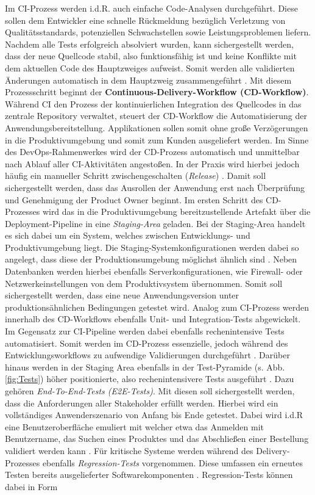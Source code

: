 Im CI-Prozess werden i.d.R. auch einfache Code-Analysen durchgeführt. Diese sollen dem Entwickler eine schnelle Rückmeldung bezüglich Verletzung von Qualitätsstandards, potenziellen Schwachstellen sowie Leistungsproblemen liefern. Nachdem alle Tests erfolgreich absolviert wurden, kann sichergestellt werden, dass der neue Quellcode stabil, also funktionsfähig ist und keine Konflikte mit dem aktuellen Code des Hauptzweiges aufweist. Somit werden alle validierten Änderungen automatisch in dem Hauptzweig zusammengeführt \cite[S. 19 ff.]{Halstenberg.2020}. Mit diesem Prozessschritt beginnt der \textbf{Continuous-Delivery-Workflow (\acs{CD}-Workflow)}.\\ Während CI den Prozess der kontinuierlichen Integration des Quellcodes in das zentrale Repository verwaltet, steuert der CD-Workflow die Automatisierung der Anwendungsbereitstellung. Applikationen sollen somit ohne große Verzögerungen in die Produktivumgebung und somit zum Kunden ausgeliefert werden. Im Sinne des DevOps-Rahmenwerkes wird der CD-Prozess automatisch und unmittelbar nach Ablauf aller CI-Aktivitäten angestoßen. In der Praxis wird hierbei jedoch häufig ein manueller Schritt zwischengeschalten (\textit{Release}) \cite[S. 19 ff.]{Halstenberg.2020}. Damit soll sichergestellt werden, dass das Ausrollen der Anwendung erst nach Überprüfung und Genehmigung der Product Owner beginnt. Im ersten Schritt des CD-Prozesses wird das in die Produktivumgebung bereitzustellende Artefakt über die Deployment-Pipeline in eine \textit{Staging-Area} geladen. Bei der Staging-Area handelt es sich dabei um ein System, welches zwischen Entwicklungs- und Produktivumgebung liegt. Die Staging-Systemkonfigurationen werden dabei so angelegt, dass diese der Produktionsumgebung möglichst ähnlich sind \cite{Reynolds.20220203}. Neben Datenbanken werden hierbei ebenfalls Serverkonfigurationen, wie Firewall- oder Netzwerkeinstellungen von dem Produktivsystem übernommen. Somit soll sichergestellt werden, dass eine neue Anwendungsversion unter produktionsähnlichen Bedingungen getestet wird. Analog zum CI-Prozess werden innerhalb des CD-Workflows ebenfalls Unit- und Integration-Tests abgewickelt. Im Gegensatz zur CI-Pipeline werden dabei ebenfalls rechenintensive Tests automatisiert. Somit werden im CD-Prozess essenzielle, jedoch während des Entwicklungsworkflows zu aufwendige Validierungen durchgeführt \cite[20]{Halstenberg.2020}. Darüber hinaus werden in der Staging Area ebenfalls in der Test-Pyramide (s. Abb. \ref{fig:Tests}) höher positionierte, also rechenintensivere Tests ausgeführt \cite{Bose.20230220}. Dazu gehören \textit{End-To-End-Tests (\acs{E2E-Test}s)}. Mit diesen soll sichergestellt werden, dass die Anforderungen aller Stakeholder erfüllt werden. Hierbei wird ein vollständiges Anwenderszenario von Anfang bis Ende getestet. Dabei wird i.d.R eine Benutzeroberfläche emuliert mit welcher etwa das Anmelden mit Benutzername, das Suchen eines Produktes und das Abschließen einer Bestellung validiert werden kann \cite{Bose.20230220}. Für kritische Systeme werden während des Delivery-Prozesses ebenfalls \textit{Regression-Tests} vorgenommen. Diese umfassen ein erneutes Testen bereits ausgelieferter Softwarekomponenten \cite[S. 15 ff.]{Engstrom.2010}. Regression-Tests können dabei in Form 